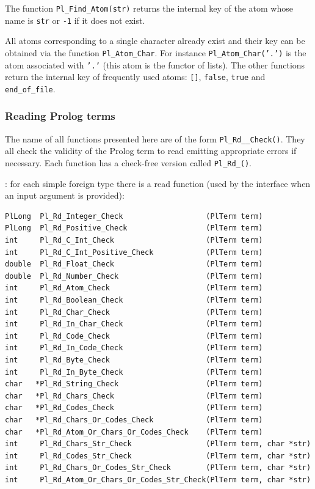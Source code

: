 The function \texttt{Pl\_Find\_Atom(str)} returns the internal key of the
atom whose name is \texttt{str} or \texttt{-1} if it does not exist.

All atoms corresponding to a single character already exist and their
key can be obtained via the function \texttt{Pl\_Atom\_Char}.  For
instance \texttt{Pl\_Atom\_Char('.')} is the atom associated with
\texttt{'.'} (this atom is the functor of lists). The other functions return
the internal key of frequently used atoms: \texttt{[]},
\texttt{false}, \texttt{true} and \texttt{end\_of\_file}.

\subsubsection{Reading Prolog terms}
\label{Reading-Prolog-terms}
The name of all functions presented here are of the form
\texttt{Pl\_Rd\_\_Check()}. They all check the validity of the
Prolog term to read emitting appropriate errors if necessary. Each function
has a check-free version called \texttt{Pl\_Rd\_()}.

: for each simple foreign type
 there is a read function (used by the
interface when an input argument is provided):

\begin{Code}
\begin{verbatim}
PlLong  Pl_Rd_Integer_Check                   (PlTerm term)
PlLong  Pl_Rd_Positive_Check                  (PlTerm term)
int     Pl_Rd_C_Int_Check                     (PlTerm term)
int     Pl_Rd_C_Int_Positive_Check            (PlTerm term)
double  Pl_Rd_Float_Check                     (PlTerm term)
double  Pl_Rd_Number_Check                    (PlTerm term)
int     Pl_Rd_Atom_Check                      (PlTerm term)
int     Pl_Rd_Boolean_Check                   (PlTerm term)
int     Pl_Rd_Char_Check                      (PlTerm term)
int     Pl_Rd_In_Char_Check                   (PlTerm term)
int     Pl_Rd_Code_Check                      (PlTerm term)
int     Pl_Rd_In_Code_Check                   (PlTerm term)
int     Pl_Rd_Byte_Check                      (PlTerm term)
int     Pl_Rd_In_Byte_Check                   (PlTerm term)
char   *Pl_Rd_String_Check                    (PlTerm term)
char   *Pl_Rd_Chars_Check                     (PlTerm term)
char   *Pl_Rd_Codes_Check                     (PlTerm term)
char   *Pl_Rd_Chars_Or_Codes_Check            (PlTerm term)
char   *Pl_Rd_Atom_Or_Chars_Or_Codes_Check    (PlTerm term)
int     Pl_Rd_Chars_Str_Check                 (PlTerm term, char *str)
int     Pl_Rd_Codes_Str_Check                 (PlTerm term, char *str)
int     Pl_Rd_Chars_Or_Codes_Str_Check        (PlTerm term, char *str)
int     Pl_Rd_Atom_Or_Chars_Or_Codes_Str_Check(PlTerm term, char *str)
\end{verbatim}
\end{Code}

